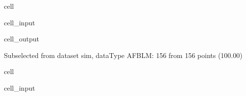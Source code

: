 \documentclass[letterpaper,table,10pt,english]{jupyterBook}
\begin{document}
\begin{sphinxuseclass}{cell}\begin{sphinxVerbatimInput}

\begin{sphinxuseclass}{cell_input}
\begin{sphinxVerbatim}[commandchars=\\\{\}]

   
   
\end{sphinxVerbatim}

\end{sphinxuseclass}\end{sphinxVerbatimInput}
\begin{sphinxVerbatimOutput}

\begin{sphinxuseclass}{cell_output}
\begin{sphinxVerbatim}[commandchars=\\\{\}]
Subselected from dataset \PYGZsq{}sim\PYGZsq{}, dataType \PYGZsq{}AFBLM\PYGZsq{}: 156 from 156 points (100.00\PYGZpc{})
\end{sphinxVerbatim}

\end{sphinxuseclass}\end{sphinxVerbatimOutput}

\end{sphinxuseclass}
\begin{sphinxuseclass}{cell}\begin{sphinxVerbatimInput}

\begin{sphinxuseclass}{cell_input}
\begin{sphinxVerbatim}[commandchars=\\\{\}]
  
\end{sphinxVerbatim}

\end{sphinxuseclass}\end{sphinxVerbatimInput}

\end{sphinxuseclass}
\end{document}
